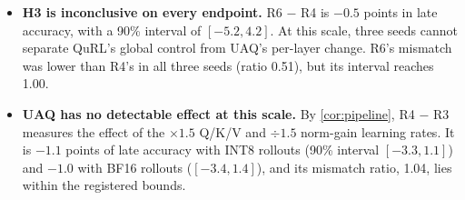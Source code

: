 \begin{itemize}[leftmargin=*,itemsep=2pt]
\begin{itemize}[leftmargin=*,itemsep=1pt]
  \end{itemize}
\item \textbf{H3 is inconclusive on every endpoint.} R6 $-$ R4 is $-0.5$ points in late accuracy, with a 90\% interval of $[-5.2, 4.2]$. At this scale, three seeds cannot separate QuRL's global control from UAQ's per-layer change. R6's mismatch was lower than R4's in all three seeds (ratio 0.51), but its interval reaches 1.00.
\item \textbf{UAQ has no detectable effect at this scale.} By \cref{cor:pipeline}, R4 $-$ R3 measures the effect of the $\times1.5$ Q/K/V and $\div1.5$ norm-gain learning rates. It is $-1.1$ points of late accuracy with INT8 rollouts (90\% interval $[-3.3, 1.1]$) and $-1.0$ with BF16 rollouts ($[-3.4, 1.4]$), and its mismatch ratio, 1.04, lies within the registered bounds.
\end{itemize}


